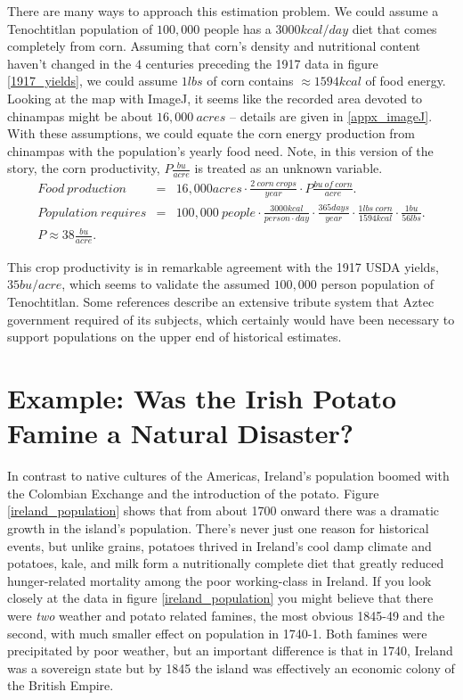 \documentclass[prb,preprint]{revtex4-2}
\newcommand{\bea}{\begin{eqnarray}}
\newcommand{\eea}{\end{eqnarray}}
\begin{document}
There are many ways to approach this estimation problem.  We could assume a Tenochtitlan population of $100,000$ people has a $3000kcal/day$ diet that comes completely from corn.  Assuming that corn's density and nutritional content haven't changed in the $4$ centuries preceding the 1917 data in figure \ref{1917_yields}, we could assume $1lbs$ of corn contains $\approx1594kcal$ of food energy.  
Looking at the map with ImageJ,\cite{imageJ} it seems like the recorded area devoted to chinampas might be about
$16,000~acres$ -- details are given in \ref{appx_imageJ}.
With these assumptions, we could equate the corn energy production from chinampas with the population's yearly food need. Note, in this version of the story, the corn productivity, $P\frac{bu}{acre}$ is treated as an unknown variable.  
\bea
Food~production &=& 16,000acres\cdot \frac{2~corn~crops}{year}\cdot P \frac{bu~of~corn}{acre} . \\
Population~requires &=& 100,000~people\cdot \frac{3000kcal}{person\cdot day}\cdot\frac{365days}{year}\cdot\frac{1lbs~corn}{1594kcal}\cdot\frac{1bu}{56lbs} . \\
P \approx 38\frac{bu}{acre} . && 
\eea

This crop productivity is in remarkable agreement with the 1917 USDA yields, $35bu/acre$, which seems to validate the assumed $100,000$ person population of Tenochtitlan.  Some references\cite{Chinampas_1964} describe an extensive tribute system that Aztec government required of its subjects, which certainly would have been necessary to support populations on the upper end of historical estimates.\cite{400k}




\clearpage


\section{Example: Was the Irish Potato Famine a Natural Disaster?}
In contrast to native cultures of the Americas, Ireland's population boomed with the Colombian Exchange and the introduction of the potato.\cite{potato,little_ice_age}  Figure \ref{ireland_population} shows that from about 1700 onward there was a dramatic growth in the island's population.  There's never just one reason for historical events, but unlike grains, potatoes thrived in Ireland's cool damp climate and potatoes, kale, and milk form a nutritionally complete diet that greatly reduced hunger-related mortality among the poor working-class in Ireland.  If you look closely at the data in figure \ref{ireland_population} you might believe that there were \textit{two} weather and potato related famines, the most obvious 1845-49 and the second, with much smaller effect on population in 1740-1.  Both famines were precipitated by poor weather, but an important difference is that in 1740, Ireland was a sovereign state but by 1845 the island was effectively an economic colony of the British Empire.\cite{little_ice_age}  
\end{document}
